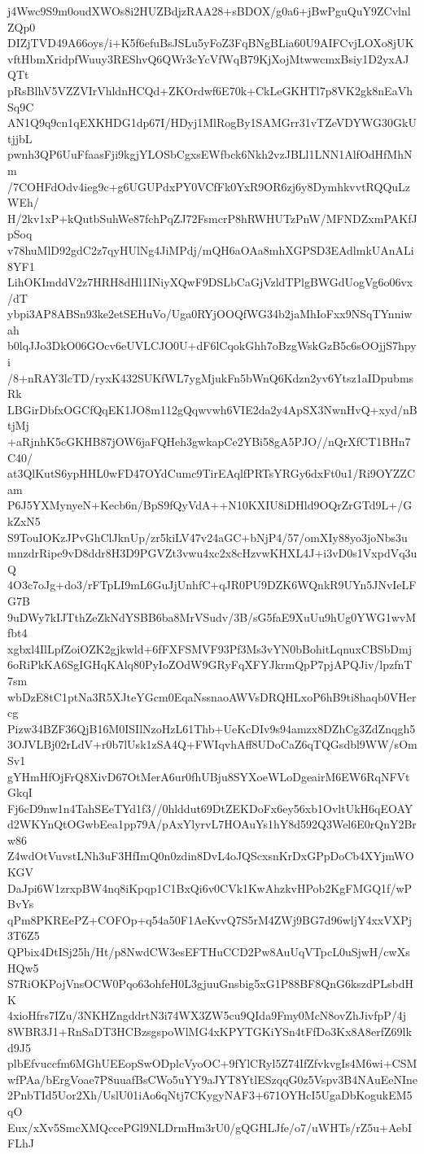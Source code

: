 j4Wwc9S9m0oudXWOs8i2HUZBdjzRAA28+sBDOX/g0a6+jBwPguQuY9ZCvlnlZQp0
DIZjTVD49A66oys/i+K5f6efuBsJSLu5yFoZ3FqBNgBLia60U9AIFCvjLOXo8jUK
vftHbmXridpfWuuy3REShvQ6QWr3cYcVfWqB79KjXojMtwwcmxBsiy1D2yxAJQTt
pRsBlhV5VZZVIrVhldnHCQd+ZKOrdwf6E70k+CkLeGKHTl7p8VK2gk8nEaVhSq9C
AN1Q9q9cn1qEXKHDG1dp67I/HDyj1MlRogBy1SAMGrr31vTZeVDYWG30GkUtjjbL
pwnh3QP6UuFfaasFji9kgjYLOSbCgxsEWfbck6Nkh2vzJBLl1LNN1AlfOdHfMhNm
/7COHFdOdv4ieg9c+g6UGUPdxPY0VCfFk0YxR9OR6zj6y8DymhkvvtRQQuLzWEh/
H/2kv1xP+kQutbSuhWe87fchPqZJ72FsmcrP8hRWHUTzPnW/MFNDZxmPAKfJpSoq
v78huMlD92gdC2z7qyHUlNg4JiMPdj/mQH6aOAa8mhXGPSD3EAdlmkUAnALi8YF1
LihOKImddV2z7HRH8dHl1INiyXQwF9DSLbCaGjVzldTPlgBWGdUogVg6o06vx/dT
ybpi3AP8ABSn93ke2etSEHuVo/Uga0RYjOOQfWG34b2jaMhIoFxx9NSqTYnniwah
b0lqJJo3DkO06GOcv6eUVLCJO0U+dF6lCqokGhh7oBzgWskGzB5c6sOOjjS7hpyi
/8+nRAY3lcTD/ryxK432SUKfWL7ygMjukFn5bWnQ6Kdzn2yv6Ytsz1aIDpubmsRk
LBGirDbfxOGCfQqEK1JO8m112gQqwvwh6VIE2da2y4ApSX3NwnHvQ+xyd/nBtjMj
+aRjnhK5cGKHB87jOW6jaFQHeh3gwkapCe2YBi58gA5PJO//nQrXfCT1BHn7C40/
at3QlKutS6ypHHL0wFD47OYdCumc9TirEAqlfPRTsYRGy6dxFt0u1/Ri9OYZZCam
P6J5YXMynyeN+Kecb6n/BpS9fQyVdA++N10KXIU8iDHld9OQrZrGTd9L+/GkZxN5
S9TouIOKzJPvGhClJknUp/zr5kiLV47v24aGC+bNjP4/57/omXIy88yo3joNbs3u
mnzdrRipe9vD8ddr8H3D9PGVZt3vwu4xc2x8cHzvwKHXL4J+i3vD0s1VxpdVq3uQ
4O3c7oJg+do3/rFTpLI9mL6GuJjUnhfC+qJR0PU9DZK6WQnkR9UYn5JNvIeLFG7B
9uDWy7kIJTthZeZkNdYSBB6ba8MrVSudv/3B/sG5faE9XuUu9hUg0YWG1wvMfbt4
xgbxl4IlLpfZoiOZK2gjkwld+6fFXFSMVF93Pf3Ms3vYN0bBohitLqnuxCBSbDmj
6oRiPkKA6SgIGHqKAlq80PyIoZOdW9GRyFqXFYJkrmQpP7pjAPQJiv/lpzfnT7sm
wbDzE8tC1ptNa3R5XJteYGcm0EqaNssnaoAWVsDRQHLxoP6hB9ti8haqb0VHercg
Pizw34BZF36QjB16M0ISIlNzoHzL61Thb+UeKcDIv9s94amzx8DZhCg3ZdZnqgh5
3OJVLBj02rLdV+r0b7lUsk1zSA4Q+FWIqvhAff8UDoCaZ6qTQGsdbl9WW/sOmSv1
gYHmHfOjFrQ8XivD67OtMerA6ur0fhUBju8SYXoeWLoDgeairM6EW6RqNFVtGkqI
Fj6cD9nw1n4TahSEeTYd1f3//0hlddut69DtZEKDoFx6ey56xb1OvltUkH6qEOAY
d2WKYnQtOGwbEea1pp79A/pAxYlyrvL7HOAuYs1hY8d592Q3Wel6E0rQnY2Brw86
Z4wdOtVuvstLNh3uF3HfImQ0n0zdin8DvL4oJQScxsnKrDxGPpDoCb4XYjmWOKGV
DaJpi6W1zrxpBW4nq8iKpqp1C1BxQi6v0CVk1KwAhzkvHPob2KgFMGQ1f/wPBvYs
qPm8PKREePZ+COFOp+q54a50F1AeKvvQ7S5rM4ZWj9BG7d96wljY4xxVXPj3T6Z5
QPbix4DtISj25h/Ht/p8NwdCW3esEFTHuCCD2Pw8AuUqVTpcL0uSjwH/cwXsHQw5
S7RiOKPojVnsOCW0Pqo63ohfeH0L3gjuuGnsbig5xG1P88BF8QnG6kszdPLsbdHK
4xioHfrs7IZu/3NKHZngddrtN3i74WX3ZW5cu9QIda9Fmy0McN8ovZhJivfpP/4j
8WBR3J1+RnSaDT3HCBzsgspoWlMG4xKPYTGKiYSn4tFfDo3Kx8A8erfZ69lkd9J5
plbEfvuccfm6MGhUEEopSwODplcVyoOC+9fYlCRyl5Z74IfZfvkvgIs4M6wi+CSM
wfPAa/bErgVoae7P8uuafBsCWo5uYY9aJYT8YtlESzqqG0z5Vspv3B4NAuEeNIne
2PnbTId5Uor2Xh/UslU01iAo6qNtj7CKygyNAF3+671OYHcI5UgaDbKogukEM5qO
Eux/xXv5SmcXMQccePGl9NLDrmHm3rU0/gQGHLJfe/o7/uWHTs/rZ5u+AebIFLhJ
